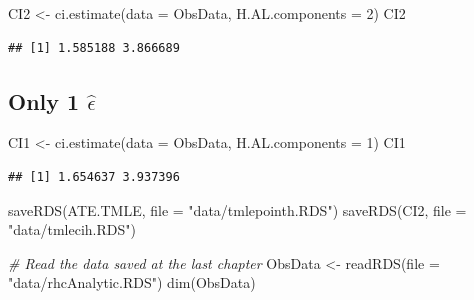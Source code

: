 \documentclass[
]{book}
\newenvironment{Shaded}{\begin{snugshade}}{\end{snugshade}}
\newcommand{\AttributeTok}[1]{\textcolor[rgb]{0.77,0.63,0.00}{#1}}
\newcommand{\CommentTok}[1]{\textcolor[rgb]{0.56,0.35,0.01}{\textit{#1}}}
\newcommand{\DecValTok}[1]{\textcolor[rgb]{0.00,0.00,0.81}{#1}}
\newcommand{\FunctionTok}[1]{\textcolor[rgb]{0.00,0.00,0.00}{#1}}
\newcommand{\NormalTok}[1]{#1}
\newcommand{\OtherTok}[1]{\textcolor[rgb]{0.56,0.35,0.01}{#1}}
\newcommand{\StringTok}[1]{\textcolor[rgb]{0.31,0.60,0.02}{#1}}
\begin{document}
\begin{Shaded}
\begin{Highlighting}[]
\NormalTok{CI2 }\OtherTok{\textless{}{-}} \FunctionTok{ci.estimate}\NormalTok{(}\AttributeTok{data =}\NormalTok{ ObsData, }\AttributeTok{H.AL.components =} \DecValTok{2}\NormalTok{) }
\NormalTok{CI2}
\end{Highlighting}
\end{Shaded}

\begin{verbatim}
## [1] 1.585188 3.866689
\end{verbatim}

\hypertarget{only-1-hatepsilon-4}{%
\subsection{\texorpdfstring{Only 1 \(\hat\epsilon\)}{Only 1 \textbackslash hat\textbackslash epsilon}}\label{only-1-hatepsilon-4}}

\begin{Shaded}
\begin{Highlighting}[]
\NormalTok{CI1 }\OtherTok{\textless{}{-}} \FunctionTok{ci.estimate}\NormalTok{(}\AttributeTok{data =}\NormalTok{ ObsData, }\AttributeTok{H.AL.components =} \DecValTok{1}\NormalTok{) }
\NormalTok{CI1}
\end{Highlighting}
\end{Shaded}

\begin{verbatim}
## [1] 1.654637 3.937396
\end{verbatim}

\begin{Shaded}
\begin{Highlighting}[]
\FunctionTok{saveRDS}\NormalTok{(ATE.TMLE, }\AttributeTok{file =} \StringTok{"data/tmlepointh.RDS"}\NormalTok{) }
\FunctionTok{saveRDS}\NormalTok{(CI2, }\AttributeTok{file =} \StringTok{"data/tmlecih.RDS"}\NormalTok{)}
\end{Highlighting}
\end{Shaded}

\begin{Shaded}
\begin{Highlighting}[]
\CommentTok{\# Read the data saved at the last chapter}
\NormalTok{ObsData }\OtherTok{\textless{}{-}} \FunctionTok{readRDS}\NormalTok{(}\AttributeTok{file =} \StringTok{"data/rhcAnalytic.RDS"}\NormalTok{)}
\FunctionTok{dim}\NormalTok{(ObsData)}
\end{Highlighting}
\end{Shaded}
\end{document}
